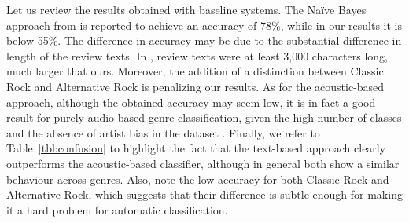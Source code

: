 
Let us review the results obtained with baseline systems. The Na\"{i}ve Bayes approach from \cite{Hu2005} is reported to achieve an accuracy of 78\%, while in our results it is below 55\%. The difference in accuracy may be due to the substantial difference in length of the review texts. In \cite{Hu2005}, review texts were at least 3,000 characters long, much larger that ours. Moreover, the addition of a distinction between Classic Rock and Alternative Rock is penalizing our results. 
As for the acoustic-based approach, although the obtained accuracy may seem low, it is in fact a good result for purely audio-based genre classification, given the high number of classes and the absence of artist bias in the dataset \cite{bogdanov2016cross}.
Finally, we refer to Table~\ref{tbl:confusion} to highlight the fact that the text-based approach clearly outperforms the acoustic-based classifier, although in general both show a similar behaviour across genres. Also, note the low accuracy for both Classic Rock and Alternative Rock, which suggests that their difference is subtle enough for making it a hard problem for automatic classification.

